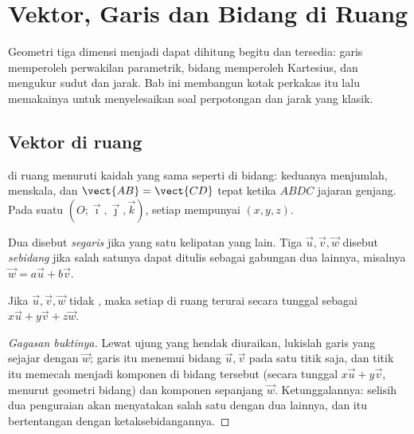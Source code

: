 \chapter{Vektor, Garis dan Bidang di Ruang}\label{ch:g12:space}

Geometri tiga dimensi menjadi dapat dihitung begitu  dan
 tersedia: garis memperoleh perwakilan parametrik, bidang memperoleh
 Kartesius, dan  mengukur sudut dan jarak.
Bab ini membangun kotak perkakas itu lalu memakainya untuk menyelesaikan soal
perpotongan dan jarak yang klasik.

\section{Vektor di ruang}

 di ruang menuruti kaidah yang sama seperti di bidang: keduanya menjumlah,
menskala, dan $\vect{AB} = \vect{CD}$ tepat ketika $ABDC$ jajaran genjang. Pada suatu
 $(O; \vec\imath, \vec\jmath, \vec k)$, setiap  mempunyai
 $(x, y, z)$.

\begin{definition}\label{def:g12:space:collinear}
Dua  disebut \emph{segaris} jika yang satu kelipatan yang lain. Tiga
 $\vec u, \vec v, \vec w$ disebut \emph{sebidang} jika salah
satunya dapat ditulis sebagai gabungan dua  lainnya, misalnya
$\vec w = a\vec u + b\vec v$.
\end{definition}

\begin{proposition}\label{prop:g12:space:basis}
Jika $\vec u, \vec v, \vec w$ tidak , maka setiap  di ruang
terurai secara tunggal sebagai $x\vec u + y\vec v + z\vec w$.
\end{proposition}

\begin{proof}[Gagasan buktinya]
Lewat ujung  yang hendak diuraikan, lukislah garis yang sejajar dengan
$\vec w$; garis itu menemui bidang $\vec u, \vec v$ pada satu titik saja, dan titik
itu memecah  menjadi komponen di bidang tersebut (secara tunggal
$x\vec u + y\vec v$, menurut geometri bidang) dan komponen sepanjang $\vec w$.
Ketunggalannya: selisih dua penguraian akan menyatakan salah satu 
dengan dua  lainnya, dan itu bertentangan dengan ketaksebidangannya.
\end{proof}

